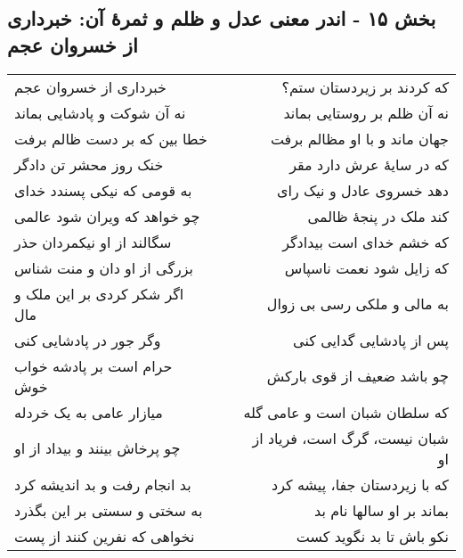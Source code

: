 \begin{center}
\section*{بخش ۱۵ - اندر معنی عدل و ظلم و ثمرهٔ آن: خبرداری از خسروان عجم}
\label{sec:015}
\begin{longtable}{l p{0.5cm} r}
خبرداری از خسروان عجم
&&
که کردند بر زیردستان ستم؟
\\
نه آن شوکت و پادشایی بماند
&&
نه آن ظلم بر روستایی بماند
\\
خطا بین که بر دست ظالم برفت
&&
جهان ماند و با او مظالم برفت
\\
خنک روز محشر تن دادگر
&&
که در سایهٔ عرش دارد مقر
\\
به قومی که نیکی پسندد خدای
&&
دهد خسروی عادل و نیک رای
\\
چو خواهد که ویران شود عالمی
&&
کند ملک در پنجهٔ ظالمی
\\
سگالند از او نیکمردان حذر
&&
که خشم خدای است بیدادگر
\\
بزرگی از او دان و منت شناس
&&
که زایل شود نعمت ناسپاس
\\
اگر شکر کردی بر این ملک و مال
&&
به مالی و ملکی رسی بی زوال
\\
وگر جور در پادشایی کنی
&&
پس از پادشایی گدایی کنی
\\
حرام است بر پادشه خواب خوش
&&
چو باشد ضعیف از قوی بارکش
\\
میازار عامی به یک خردله
&&
که سلطان شبان است و عامی گله
\\
چو پرخاش بینند و بیداد از او
&&
شبان نیست، گرگ است، فریاد از او
\\
بد انجام رفت و بد اندیشه کرد
&&
که با زیردستان جفا، پیشه کرد
\\
به سختی و سستی بر این بگذرد
&&
بماند بر او سالها نام بد
\\
نخواهی که نفرین کنند از پست
&&
نکو باش تا بد نگوید کست
\\
\end{longtable}
\end{center}
